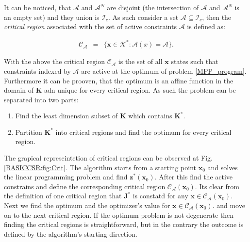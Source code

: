     It can be noticed, that $\mathcal{A}$ and $\mathcal{A}^N$ are disjoint (the intersection of $\mathcal{A}$ and $\mathcal{A}^N$ is an empty set) and they union is $\mathcal{I}_c$. As such consider a set $\mathcal{A}\subseteq\mathcal{I}_c$, then the \emph{critical region} associated with the set of active constraints $\mathcal{A}$ is defined as:

    \begin{equation}
    \begin{array}{rcl}
            \mathcal{C}_{\mathcal{A}}&=&\{\textbf{x}\in\mathcal{K}^*:\mathcal{A}(x)=\mathcal{A}\}.
        \end{array}
        \label{BASICMPC:equ:MPP_stateset_optimal critical}
    \end{equation}
    
    With the above the critical region $\mathcal{C}_{\mathcal{A}}$ is the set of all $\textbf{x}$ states such that constraints indexed by $\mathcal{A}$ are active at the optimum of problem \ref{MPP_program}. Furthermore it can be prooven, that the optimum is an affine function in the domain of $\textbf{K}$ adn unique for every critical region. As such the problem can be separated into two parts:
    
    \begin{enumerate}
    \item Find the least dimension subset of $\textbf{K}$ which contains $\textbf{K}^*$.
    \item Partition $\textbf{K}^*$ into critical regions and find the optimum for every critical region.
    \end{enumerate}
    
    The grapical represeintetion of critical regions can be observed at Fig.\ref{BASICCSR:fig:Crit}. The algorithm starts from a starting point $\textbf{x}_0$ and solves the linear programming problem and find $\textbf{z}^*(\textbf{x}_0)$. After this find the active constrains and define the corresponding critical region $\mathcal{C}_{\mathcal{A}}(\textbf{x}_0)$. Its clear from the definition of one critical region that $\textbf{J}^*$ is constatd for any $\textbf{x}\in\mathcal{C}_{\mathcal{A}}(\textbf{x}_0)$. Next  we find the optimum and the optimizer's value for $\textbf{x}\in\mathcal{C}_{\mathcal{A}}(\textbf{x}_0)$. and move on to the next critical region. If the optimum problem is not degenerate then finding the critical regions is straightforward, but in the contrary the outcome is defined by the algorithm's starting direction.
    
